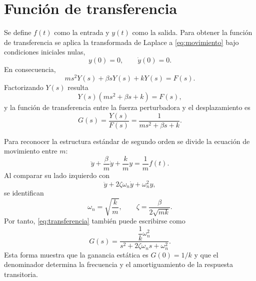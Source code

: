 \section{Función de transferencia}

Se define $f(t)$ como la entrada y $y(t)$ como la salida. Para obtener la función de transferencia se aplica la transformada de Laplace a \eqref{eq:movimiento} bajo condiciones iniciales nulas,
\begin{equation}
  y(0)=0, \qquad \dot y(0)=0.
\end{equation}
En consecuencia,
\begin{equation}
  ms^2Y(s)+\beta sY(s)+kY(s)=F(s).
\end{equation}
Factorizando $Y(s)$ resulta
\begin{equation}
  Y(s)\left(ms^2+\beta s+k\right)=F(s),
\end{equation}
y la función de transferencia entre la fuerza perturbadora y el desplazamiento es
\begin{equation}
  \boxed{G(s)=\frac{Y(s)}{F(s)}
  =\frac{1}{ms^2+\beta s+k}}.
  \label{eq:transferencia}
\end{equation}

Para reconocer la estructura estándar de segundo orden se divide la ecuación de movimiento entre $m$:
\begin{equation}
  \ddot y+\frac{\beta}{m}\dot y+\frac{k}{m}y
  =\frac{1}{m}f(t).
  \label{eq:normalizada}
\end{equation}
Al comparar su lado izquierdo con
\begin{equation}
  \ddot y+2\zeta\omega_n\dot y+\omega_n^2y,
\end{equation}
se identifican
\begin{equation}
  \boxed{\omega_n=\sqrt{\frac{k}{m}}},
  \qquad
  \boxed{\zeta=\frac{\beta}{2\sqrt{mk}}}.
  \label{eq:parametros_dinamicos}
\end{equation}
Por tanto, \eqref{eq:transferencia} también puede escribirse como
\begin{equation}
  G(s)=
  \frac{\dfrac{1}{k}\omega_n^2}
  {s^2+2\zeta\omega_ns+\omega_n^2}.
  \label{eq:transferencia_estandar}
\end{equation}
Esta forma muestra que la ganancia estática es $G(0)=1/k$ y que el denominador determina la frecuencia y el amortiguamiento de la respuesta transitoria.

